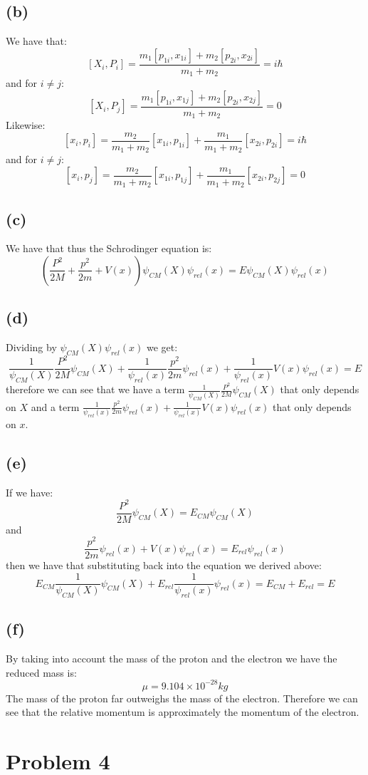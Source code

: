 \documentclass[11pt]{article}
\begin{document}
\subsection*{(b)}
We have that: 
$$[X_i,P_i] = \frac{m_1[p_{1i},x_{1i}]+m_2[p_{2i},x_{2i}]}{m_1+m_2} = i\hbar$$
and for $i\neq j$:
$$[X_i,P_j] = \frac{m_1[p_{1i},x_{1j}]+m_2[p_{2i},x_{2j}]}{m_1+m_2} = 0$$
Likewise:
$$[x_i,p_i] = \frac{m_2}{m_1+m_2}[x_{1i},p_{1i}]+\frac{m_1}{m_1+m_2}[x_{2i},p_{2i}] = i\hbar$$
and for $i\neq j$:
$$[x_i,p_j] = \frac{m_2}{m_1+m_2}[x_{1i},p_{1j}]+\frac{m_1}{m_1+m_2}[x_{2i},p_{2j}] = 0$$
\subsection*{(c)}
We have that thus the Schrodinger equation is:
$$\left(\frac{P^2}{2M}+\frac{p^2}{2m}+V(x)\right) \psi_{CM}(X)\psi_{rel}(x) = E\psi_{CM}(X)\psi_{rel}(x)$$
\subsection*{(d)}
Dividing by $\psi_{CM}(X)\psi_{rel}(x)$ we get:
$$\frac{1}{\psi_{CM}(X)}\frac{P^2}{2M}\psi_{CM}(X)+\frac{1}{\psi_{rel}(x)}\frac{p^2}{2m}\psi_{rel}(x)+\frac{1}{\psi_{rel}(x)}V(x)\psi_{rel}(x) = E$$
therefore we can see that we have a term $\frac{1}{\psi_{CM}(X)}\frac{P^2}{2M}\psi_{CM}(X)$ that only 
depends on $X$ and a term $\frac{1}{\psi_{rel}(x)}\frac{p^2}{2m}\psi_{rel}(x)+\frac{1}{\psi_{rel}(x)}V(x)\psi_{rel}(x)$ that only depends on $x$.
\subsection*{(e)}
If we have: 
$$\frac{P^2}{2M}\psi_{CM}(X) = E_{CM}\psi_{CM}(X)$$
and 
$$\frac{p^2}{2m}\psi_{rel}(x)+V(x)\psi_{rel}(x) = E_{rel}\psi_{rel}(x)$$
then we have that substituting back into the equation we derived above:
$$E_{CM}\frac{1}{\psi_{CM}(X)}\psi_{CM}(X)+E_{rel}\frac{1}{\psi_{rel}(x)}\psi_{rel}(x) = E_{CM}+E_{rel} = E$$
\subsection*{(f)}
By taking into account the mass of the proton and the electron we have the 
reduced mass is:
$$\mu = 9.104\times 10^{-28} kg$$
The mass of the proton far outweighs the 
mass of the electron. Therefore we can see that the relative momentum 
is approximately the momentum of the electron. 
\section*{Problem 4}
\end{document}
